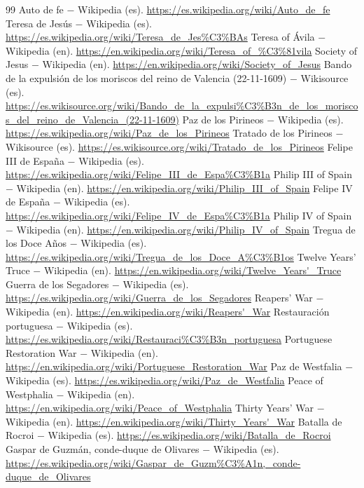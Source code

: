 \documentclass{book}
\begin{document}
\begin{thebibliography}{99}
 Auto de fe \(-\) Wikipedia (es). \url{https://es.wikipedia.org/wiki/Auto_de_fe}
 Teresa de Jesús \(-\) Wikipedia (es). \url{https://es.wikipedia.org/wiki/Teresa_de_Jes%C3%BAs}
 Teresa of Ávila \(-\) Wikipedia (en). \url{https://en.wikipedia.org/wiki/Teresa_of_%C3%81vila}
 Society of Jesus \(-\) Wikipedia (en). \url{https://en.wikipedia.org/wiki/Society_of_Jesus}
 Bando de la expulsión de los moriscos del reino de Valencia (22-11-1609) \(-\) Wikisource (es). \url{https://es.wikisource.org/wiki/Bando_de_la_expulsi%C3%B3n_de_los_moriscos_del_reino_de_Valencia_(22-11-1609)}
 Paz de los Pirineos \(-\) Wikipedia (es). \url{https://es.wikipedia.org/wiki/Paz_de_los_Pirineos}
 Tratado de los Pirineos \(-\) Wikisource (es). \url{https://es.wikisource.org/wiki/Tratado_de_los_Pirineos}
 Felipe III de España \(-\) Wikipedia (es). \url{https://es.wikipedia.org/wiki/Felipe_III_de_Espa%C3%B1a}
 Philip III of Spain \(-\) Wikipedia (en). \url{https://en.wikipedia.org/wiki/Philip_III_of_Spain}
 Felipe IV de España \(-\) Wikipedia (es). \url{https://es.wikipedia.org/wiki/Felipe_IV_de_Espa%C3%B1a}
 Philip IV of Spain \(-\) Wikipedia (en). \url{https://en.wikipedia.org/wiki/Philip_IV_of_Spain}
 Tregua de los Doce Años \(-\) Wikipedia (es). \url{https://es.wikipedia.org/wiki/Tregua_de_los_Doce_A%C3%B1os}
 Twelve Years' Truce \(-\) Wikipedia (en). \url{https://en.wikipedia.org/wiki/Twelve_Years'_Truce}
 Guerra de los Segadores \(-\) Wikipedia (es). \url{https://es.wikipedia.org/wiki/Guerra_de_los_Segadores}
 Reapers' War \(-\) Wikipedia (en). \url{https://en.wikipedia.org/wiki/Reapers'_War}
 Restauración portuguesa \(-\) Wikipedia (es). \url{https://es.wikipedia.org/wiki/Restauraci%C3%B3n_portuguesa}
 Portuguese Restoration War \(-\) Wikipedia (en). \url{https://en.wikipedia.org/wiki/Portuguese_Restoration_War}
 Paz de Westfalia \(-\) Wikipedia (es). \url{https://es.wikipedia.org/wiki/Paz_de_Westfalia}
 Peace of Westphalia \(-\) Wikipedia (en). \url{https://en.wikipedia.org/wiki/Peace_of_Westphalia}
 Thirty Years' War \(-\) Wikipedia (en). \url{https://en.wikipedia.org/wiki/Thirty_Years'_War}
 Batalla de Rocroi \(-\) Wikipedia (es). \url{https://es.wikipedia.org/wiki/Batalla_de_Rocroi}
 Gaspar de Guzmán, conde-duque de Olivares \(-\) Wikipedia (es). \url{https://es.wikipedia.org/wiki/Gaspar_de_Guzm%C3%A1n,_conde-duque_de_Olivares}

\end{thebibliography}
\end{document}
